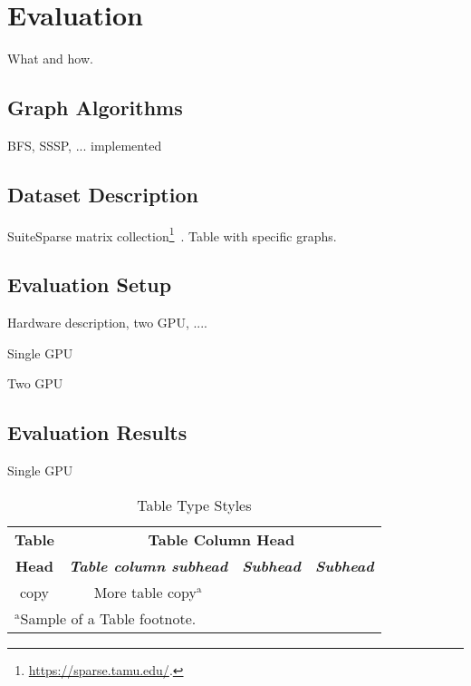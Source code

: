 \section{Evaluation}

What and how. 



\subsection{Graph Algorithms}

BFS, SSSP, ... implemented 

\subsection{Dataset Description}

SuiteSparse matrix collection\footnote{\url{https://sparse.tamu.edu/}.}~\cite{10.1145/2049662.2049663}. Table with specific graphs.

\subsection{Evaluation Setup}

Hardware description, two GPU, ....

Single GPU 

Two GPU

\subsection{Evaluation Results}

Single GPU 

\begin{table}[htbp]
    \caption{Table Type Styles}
    \begin{center}
    \begin{tabular}{|c|c|c|c|}
    \hline
    \textbf{Table}&\multicolumn{3}{|c|}{\textbf{Table Column Head}} \\
    \cline{2-4} 
    \textbf{Head} & \textbf{\textit{Table column subhead}}& \textbf{\textit{Subhead}}& \textbf{\textit{Subhead}} \\
    \hline
    copy& More table copy$^{\mathrm{a}}$& &  \\
    \hline
    \multicolumn{4}{l}{$^{\mathrm{a}}$Sample of a Table footnote.}
    \end{tabular}
    \label{tab1}
    \end{center}
\end{table}
    
